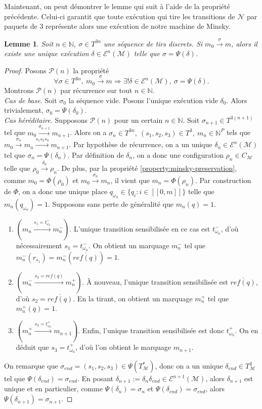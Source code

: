 \documentclass{article}
\newtheorem{lemma}{Lemme}
\theoremstyle{remark}
\theoremstyle{remark}
\newcommand{\reaches}[1][]{\xrightarrow{#1}}
\newcommand{\natinduction}[5]{
    Posons $\mathcal{#1}(n)$ la propriété \[#3.\]
    Montrons $\mathcal{#1}(n)$ par récurrence sur tout $n \in #2$.\\
    \textit{Cas de base.} #4\\
    \textit{Cas héréditaire.} Supposons $\mathcal{#1}(n)$ pour un certain $n \in #2$. #5
}
\newcommand{\runs}[2][]{\mathcal{E}^{#1}(\mathcal{#2})}
\begin{document}
Maintenant, on peut démontrer le lemme qui suit à l'aide de la propriété précédente. Celui-ci garantit que toute exécution qui tire les transitions de $\mathcal{N}$ par paquets de 3 représente alors une exécution de notre machine de Minsky.

\begin{lemma}
    \label{lemma:seq-to-run}
    Soit $n \in \mathbb{N},\ \sigma \in T^{3n}$ une séquence de tirs discrets. Si $m_0 \reaches[\sigma] m$, alors il existe une unique exécution $\delta \in \runs[n]{M}$ telle que $\sigma = \Psi(\delta)$.
\end{lemma}

\begin{proof}
    \natinduction{P}{\mathbb{N}}{\forall \sigma \in T^{3n},\ m_0 \reaches[\sigma] m \Longrightarrow \exists ! \delta \in \runs[n]{M},\ \sigma = \Psi(\delta)}{
        Soit $\sigma_0$ la séquence vide. Posons l'unique exécution vide $\delta_0$. Alors trivialement, $\sigma_0 = \Psi(\delta_0)$.
    }{
        Soit $\sigma_{n+1} \in T^{3(n+1)}$ tel que $m_0 \reaches[\sigma_{n+1}] m_{n+1}$.
        Alors on a $\sigma_n \in T^{3n},\ (s_1, s_2, s_3) \in T^3,\ m_n \in \mathbb{N}^P$ tels que $m_0 \reaches[\sigma_n] m_n \reaches[s_1s_2s_3] m_{n+1}$. Par hypothèse de récurrence, on a un unique $\delta_n \in \runs[n]{M}$ tel que $\sigma_n = \Psi(\delta_n)$. Par définition de $\delta_n$, on a donc une configuration $\rho_n \in C_{\mathcal{M}}$ telle que $\rho_0 \reaches[\delta_n] \rho_n$. De plus, par la propriété \ref{property:minsky-preservation}, comme $m_0 = \Phi(\rho_0)$ et $m_0 \reaches[\sigma_n] m_n$, il vient que $m_n = \Phi(\rho_n)$. Par construction de $\Phi$, on a donc une unique place $q_{\omega_n} \in \{q_i : i \in [\![0, m]\!]\}$ telle que $m_n(q_{\omega_n}) = 1$. Supposons sans perte de généralité que $m_n(q) = 1$.
        \begin{enumerate}
            \item $(m_n \reaches[s_1 = t_{\omega_n}^-] m_n^-)$. L'unique transition sensibilisée en ce cas est $t_{\omega_n}^-$, d'où nécessairement $s_1 = t_{\omega_n}^-$. On obtient un marquage $m_n^-$ tel que $m_n^-(r_{s_1}) = m_n^-(\overline{ref(q)}) = 1$.
            \item $(m_n^- \reaches[s_2 = ref(q)] m_n^+)$. À nouveau, l'unique transition sensibilisée est $\overline{ref(q)}$, d'où $s_2 = \overline{ref(q)}$. En la tirant, on obtient un marquage $m_n^+$ tel que $m_n^+(\overline{q}) = 1$.
            \item $(m_n^+ \reaches[s_3 = t_{\omega_n}^+] m_{n+1})$. Enfin, l'unique transition sensibilisée est donc $t_{\omega_n}^+$. On en déduit que $s_3 = t_{\omega_n}^+$, d'où l'on obtient le marquage $m_{n+1}$.
        \end{enumerate}
        On remarque que $\sigma_{end} = (s_1, s_2, s_3) \in \Psi(T_{\mathcal{M}}^*)$, donc on a un unique $\delta_{end} \in T_{\mathcal{M}}^3$ tel que $\Psi(\delta_{end}) = \sigma_{end}$. En posant $\delta_{n+1} := \delta_n \delta_{end} \in \runs[n+1]{M}$, alors $\delta_{n+1}$ est unique et en particulier, comme $\Psi(\delta_n) = \sigma_n$ et $\Psi(\delta_{end}) = \sigma_{end}$, alors $\Psi(\delta_{n+1}) = \sigma_{n+1}$.
    }
\end{proof}
\end{document}
